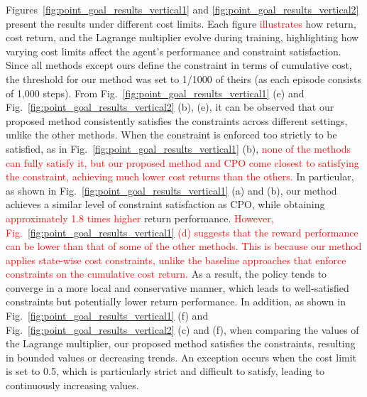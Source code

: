Figures~\ref{fig:point_goal_results_vertical1} and \ref{fig:point_goal_results_vertical2} present the results under different cost limits.
Each figure \textcolor{red}{illustrates} how return, cost return, and the Lagrange multiplier evolve during training, highlighting how varying cost limits affect the agent's performance and constraint satisfaction.
Since all methods except ours define the constraint in terms of cumulative cost, the threshold for our method was set to 1/1000 of theirs (as each episode consists of 1,000 steps).
From Fig.~\ref{fig:point_goal_results_vertical1} (e) and Fig.~\ref{fig:point_goal_results_vertical2} (b), (e), it can be observed that our proposed method consistently satisfies the constraints across different settings, unlike the other methods.
When the constraint is enforced too strictly to be satisfied, as in Fig.~\ref{fig:point_goal_results_vertical1} (b), \textcolor{red}{none of the methods can fully satisfy it, but our proposed method and CPO come closest to satisfying the constraint, achieving much lower cost returns than the others.}
In particular, as shown in Fig.~\ref{fig:point_goal_results_vertical1} (a) and (b), our method achieves a similar level of constraint satisfaction as CPO, while obtaining \textcolor{red}{approximately 1.8 times higher} return performance.  %
\textcolor{red}{However, Fig.~\ref{fig:point_goal_results_vertical1} (d) suggests that the reward performance can be lower than that of some of the other methods.}
\textcolor{red}{This is because our method applies state-wise cost constraints, unlike the baseline approaches that enforce constraints on the cumulative cost return.}
As a result, the policy tends to converge in a more local and conservative manner, which leads to well-satisfied constraints but potentially lower return performance.
In addition, as shown in Fig.~\ref{fig:point_goal_results_vertical1} (f) and Fig.~\ref{fig:point_goal_results_vertical2} (c) and (f), when comparing the values of the Lagrange multiplier, our proposed method satisfies the constraints, resulting in bounded values or decreasing trends.
An exception occurs when the cost limit is set to 0.5, which is particularly strict and difficult to satisfy, leading to continuously increasing values.

